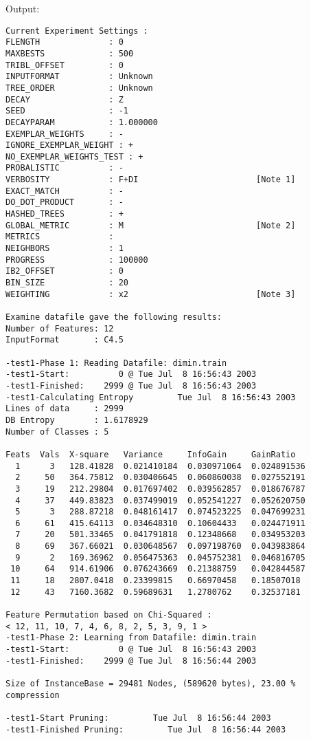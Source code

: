 Output:
\begin{verbatim}
Current Experiment Settings :
FLENGTH              : 0
MAXBESTS             : 500
TRIBL_OFFSET         : 0
INPUTFORMAT          : Unknown
TREE_ORDER           : Unknown
DECAY                : Z
SEED                 : -1
DECAYPARAM           : 1.000000
EXEMPLAR_WEIGHTS     : -
IGNORE_EXEMPLAR_WEIGHT : +
NO_EXEMPLAR_WEIGHTS_TEST : +
PROBALISTIC          : -
VERBOSITY            : F+DI                        [Note 1]
EXACT_MATCH          : -
DO_DOT_PRODUCT       : -
HASHED_TREES         : +
GLOBAL_METRIC        : M                           [Note 2]
METRICS              : 
NEIGHBORS            : 1
PROGRESS             : 100000
IB2_OFFSET           : 0
BIN_SIZE             : 20
WEIGHTING            : x2                          [Note 3]

Examine datafile gave the following results:
Number of Features: 12
InputFormat       : C4.5

-test1-Phase 1: Reading Datafile: dimin.train
-test1-Start:          0 @ Tue Jul  8 16:56:43 2003
-test1-Finished:    2999 @ Tue Jul  8 16:56:43 2003
-test1-Calculating Entropy         Tue Jul  8 16:56:43 2003
Lines of data     : 2999
DB Entropy        : 1.6178929
Number of Classes : 5

Feats  Vals  X-square   Variance     InfoGain     GainRatio
  1      3   128.41828  0.021410184  0.030971064  0.024891536
  2     50   364.75812  0.030406645  0.060860038  0.027552191
  3     19   212.29804  0.017697402  0.039562857  0.018676787
  4     37   449.83823  0.037499019  0.052541227  0.052620750
  5      3   288.87218  0.048161417  0.074523225  0.047699231
  6     61   415.64113  0.034648310  0.10604433   0.024471911
  7     20   501.33465  0.041791818  0.12348668   0.034953203
  8     69   367.66021  0.030648567  0.097198760  0.043983864
  9      2   169.36962  0.056475363  0.045752381  0.046816705
 10     64   914.61906  0.076243669  0.21388759   0.042844587
 11     18   2807.0418  0.23399815   0.66970458   0.18507018
 12     43   7160.3682  0.59689631   1.2780762    0.32537181

Feature Permutation based on Chi-Squared :
< 12, 11, 10, 7, 4, 6, 8, 2, 5, 3, 9, 1 >
-test1-Phase 2: Learning from Datafile: dimin.train
-test1-Start:          0 @ Tue Jul  8 16:56:43 2003
-test1-Finished:    2999 @ Tue Jul  8 16:56:44 2003

Size of InstanceBase = 29481 Nodes, (589620 bytes), 23.00 % compression

-test1-Start Pruning:         Tue Jul  8 16:56:44 2003
-test1-Finished Pruning:         Tue Jul  8 16:56:44 2003


\end{verbatim}
